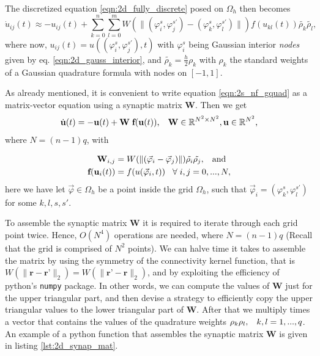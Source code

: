 \documentclass{uonmathreport}
\begin{document}
The discretized equation \ref{eqn:2d_fully_discrete} posed on $\Omega_h$ then becomes
\begin{equation}\label{eqn:2s_nf_gquad}
	\dot{u}_{ij}(t) \approx - u_{ij}(t) + \sum_{k=0}^{n} \sum_{l=0}^{m} W(\| (\varphi_i^s, \varphi_j^{s'}) - (\varphi_k^s, \varphi_l^{s'}) \|)f(u_{kl}(t))\tilde{\rho_k} \tilde{\rho_l},
\end{equation}
where now, $ u_{ij}(t) = u((\varphi_i^s, \varphi_j^{s'}),t)$ with $\varphi_i^s$ being Gaussian interior \textit{nodes} given by eq. \ref{eqn:2d_gauss_interior}, and $\tilde{\rho_k} = \frac{h}{2}\rho_k$ with $\rho_k$ the standard weights of a Gaussian quadrature formula with nodes on $[-1,1]$.

As already mentioned, it is convenient to write equation \ref{eqn:2s_nf_gquad} as a matrix-vector equation using a synaptic matrix $\mathbf{W}$. Then we get
\begin{equation}\label{eqn:2d_mat_vec}
	\dot{\mathbf{u}}(t) = -\mathbf{u}(t) + \mathbf{W} \hspace{1mm} \textbf{f}(\mathbf{u}(t)), \hspace{3mm} \mathbf{W} \in \mathbb{R}^{N^2 \times N^2}, \mathbf{u} \in \mathbb{R}^{N^2},
\end{equation}
where $N = (n-1)q$, with 

\begin{subequations}
	\begin{align}
	\mathbf{W}_{i,j} &= W(\| (\vec{\varphi}_i - \vec{\varphi}_j) \|)\tilde{\rho_i} \tilde{\rho_j}, 
	\hspace{3mm} \textnormal{and}\\
	\textbf{f}(\mathbf{u}_i(t)) &= f(u(\vec{\varphi}_i,t))
	\hspace{3mm} \forall \hspace{1mm} i,j = 0,...,N,
	\end{align}
\end{subequations}
here we have let $\vec{\varphi} \in \Omega_h$ be a point inside the grid $\Omega_h$, such that $\vec{\varphi}_i = (\varphi_k^s, \varphi_l^{s'})$ for some $k,l,s,s'$. 

To assemble the synaptic matrix $\mathbf{W}$ it is required to iterate through each grid point twice. Hence, $O(N^4)$ operations are needed, where $N=(n-1)q$ (Recall that the grid is comprised of $N^2$ points). We can halve time it takes to assemble the matrix by using the symmetry of the connectivity kernel function, that is $W(\|\textbf{r}-\textbf{r'}\|_2)=W(\|\textbf{r'}-\textbf{r}\|_2)$, and by exploiting the efficiency of python's \texttt{numpy} package. In other words, we can compute the values of $\mathbf{W}$ just for the upper triangular part, and then devise a strategy to efficiently copy the upper triangular values to the lower triangular part of $\mathbf{W}$. After that we multiply times a vector that contains the values of the quadrature weights $\rho_k\rho_l, \hspace{3mm} k,l=1,...,q$. An example of a python function that assembles the synaptic matrix $\mathbf{W}$ is given in listing \ref{lst:2d_synap_mat}.
\end{document}
